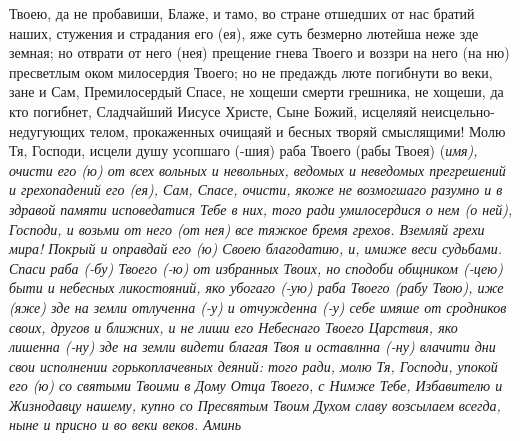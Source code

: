 Твоею, да не пробавиши, Блаже, и тамо, во стране отшедших от нас братий наших, стужения и страдания его (ея), яже суть безмерно лютейша неже зде земная; но отврати от него (нея) прещение гнева Твоего и воззри на него (на ню) пресветлым оком милосердия Твоего; но не предаждь люте погибнути во веки, зане и Сам, Премилосердый Спасе, не хощеши смерти грешника, не хощеши, да кто погибнет, Сладчайший Иисусе Христе, Сыне Божий, исцеляяй неисцельно-недугующих телом, прокаженных очищаяй и бесных творяй смыслящими! Молю Тя, Господи, исцели душу усопшаго (-шия) раба Твоего (рабы Твоея) (\itshape имя\normalfont{}), очисти его (ю) от всех вольных и невольных, ведомых и неведомых прегрешений и грехопадений его (ея), Сам, Спасе, очисти, якоже не возмогшаго разумно и в здравой памяти исповедатися Тебе в них, того ради умилосердися о нем (о ней), Господи, и возьми от него (от нея) все тяжкое бремя грехов. Вземляй грехи мира! Покрый и оправдай его (ю) Своею благодатию, и, имиже веси судьбами. Спаси раба (-бу) Твоего (-ю) от избранных Твоих, но сподоби общником (-цею) быти и небесных ликостояний, яко убогаго (-ую) раба Твоего (рабу Твою), иже (яже) зде на земли отлученна (-у) и отчужденна (-у) себе имяше от сродников своих, другов и ближних, и не лиши его Небеснаго Твоего Царствия, яко лишенна (-ну) зде на земли видети благая Твоя и оставлнна (-ну) влачити дни свои исполнении горькоплачевных деяний: того ради, молю Тя, Господи, упокой его (ю) со святыми Твоими в Дому Отца Твоего, с Нимже Тебе, Избавителю и Жизнодавцу нашему, купно со Пресвятым Твоим Духом славу возсылаем всегда, ныне и присно и во веки веков. Аминь


\mychapterending

 


